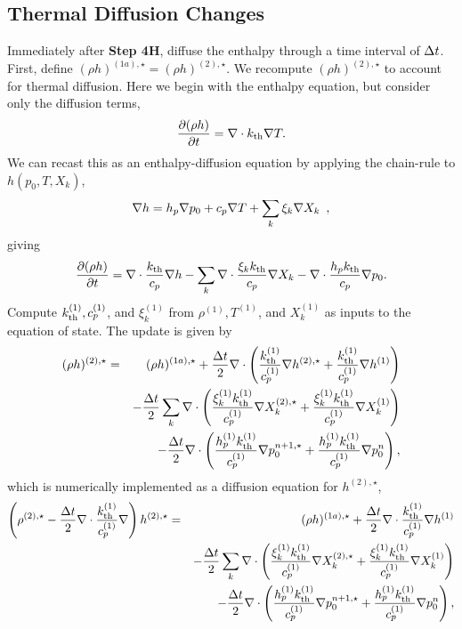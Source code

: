 \subsection{Thermal Diffusion Changes}
Immediately after {\bf Step 4H}, diffuse the enthalpy through 
a time interval of $\Delta t$.  First, define $(\rho h)^{(1a),\star} = (\rho h)^{(2),\star}$.  
We recompute $(\rho h)^{(2),\star}$ to account for thermal diffusion.  Here we begin
with the enthalpy equation, but consider only the 
diffusion terms,
\begin{equation}
\frac{\partial (\rho h)}{\partial t} = \nabla\cdot k_{\rm th}\nabla T.
  \end{equation}
We can recast this as an enthalpy-diffusion equation by applying the
chain-rule to $h(p_0,T,X_k)$,
\begin{equation}
\nabla h = h_p \nabla p_0 + c_p \nabla T + \sum_k \xi_k \nabla X_k \enskip ,
\end{equation}
giving
\begin{equation}
  \frac{\partial (\rho h)}{\partial t}  = 
 \nabla\cdot \frac{k_{\rm th}}{c_p}\nabla h -  
 \sum_k \nabla\cdot \frac{\xi_k k_{\rm th}}{c_p}\nabla X_k -
 \nabla\cdot \frac{h_p k_{\rm th}}{c_p}\nabla p_0.
  \end{equation}
Compute $k_{\rm th}^{(1)}, c_p^{(1)}$, and $\xi_k^{(1)}$ from $\rho^{(1)}, T^{(1)}$, and $X_k^{(1)}$ as inputs to the equation of state.  The update is given by
\begin{eqnarray}
(\rho h)^{(2),\star} &=& (\rho h)^{(1a),\star} + \frac{\Delta t}{2}\nabla\cdot\left(\frac{k_{\rm th}^{(1)}}{c_p^{(1)}}\nabla h^{(2),\star} + \frac{k_{\rm th}^{(1)}}{c_p^{(1)}}\nabla h^{(1)}\right)\nonumber\\
&&- \frac{\Delta t}{2}\sum_k\nabla\cdot\left(\frac{\xi_k^{(1)}k_{\rm th}^{(1)}}{c_p^{(1)}}\nabla X_k^{(2),\star} + \frac{\xi_k^{(1)}k_{\rm th}^{(1)}}{c_p^{(1)}}\nabla X_k^{(1)}\right)\nonumber\\
&&- \frac{\Delta t}{2}\nabla\cdot\left(\frac{h_p^{(1)}k_{\rm th}^{(1)}}{c_p^{(1)}}\nabla p_0^{n+1,\star} + \frac{h_p^{(1)}k_{\rm th}^{(1)}}{c_p^{(1)}}\nabla p_0^{n}\right),
\end{eqnarray}
which is numerically implemented as a diffusion equation for $h^{(2),\star}$,
\begin{eqnarray}
\left(\rho^{(2),\star} - \frac{\Delta t}{2}\nabla\cdot\frac{k_{\rm th}^{(1)}}{c_p^{(1)}}\nabla\right)h^{(2),\star} &=& (\rho h)^{(1a),\star} + \frac{\Delta t}{2}\nabla\cdot\frac{k_{\rm th}^{(1)}}{c_p^{(1)}}\nabla h^{(1)}\nonumber\\
&&- \frac{\Delta t}{2}\sum_k\nabla\cdot\left(\frac{\xi_k^{(1)}k_{\rm th}^{(1)}}{c_p^{(1)}}\nabla X_k^{(2),\star} + \frac{\xi_k^{(1)}k_{\rm th}^{(1)}}{c_p^{(1)}}\nabla X_k^{(1)}\right)\nonumber\\
&&- \frac{\Delta t}{2}\nabla\cdot\left(\frac{h_p^{(1)}k_{\rm th}^{(1)}}{c_p^{(1)}}\nabla p_0^{n+1,\star} + \frac{h_p^{(1)}k_{\rm th}^{(1)}}{c_p^{(1)}}\nabla p_0^{n}\right),
\end{eqnarray}

